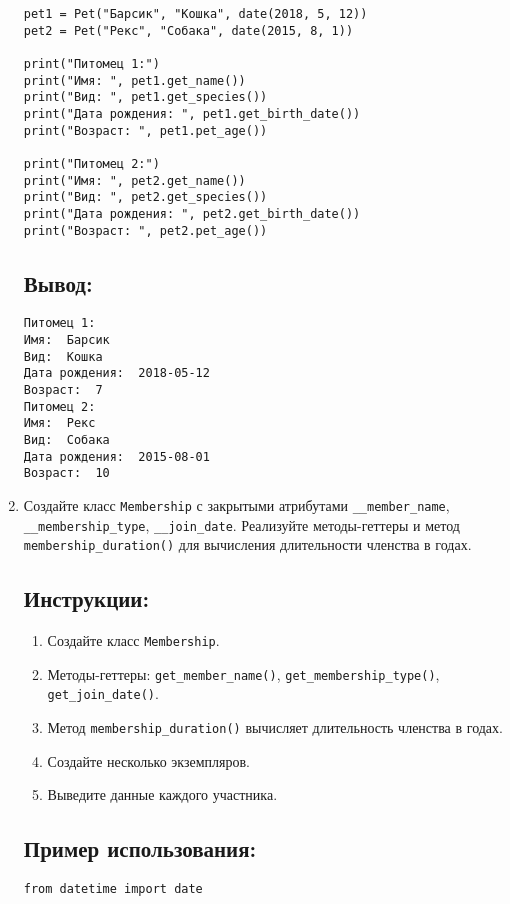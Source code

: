 \begin{enumerate}
\begin{lstlisting}[caption=Пример кода]
pet1 = Pet("Барсик", "Кошка", date(2018, 5, 12))
pet2 = Pet("Рекс", "Собака", date(2015, 8, 1))

print("Питомец 1:")
print("Имя: ", pet1.get_name())
print("Вид: ", pet1.get_species())
print("Дата рождения: ", pet1.get_birth_date())
print("Возраст: ", pet1.pet_age())

print("Питомец 2:")
print("Имя: ", pet2.get_name())
print("Вид: ", pet2.get_species())
print("Дата рождения: ", pet2.get_birth_date())
print("Возраст: ", pet2.pet_age())
\end{lstlisting}

\subsection*{Вывод:}
\begin{lstlisting}[caption=Ожидаемый вывод]
Питомец 1:
Имя:  Барсик
Вид:  Кошка
Дата рождения:  2018-05-12
Возраст:  7
Питомец 2:
Имя:  Рекс
Вид:  Собака
Дата рождения:  2015-08-01
Возраст:  10
\end{lstlisting}

\item
Создайте класс \texttt{Membership} с закрытыми атрибутами \texttt{\_\_member\_name}, \texttt{\_\_membership\_type}, \texttt{\_\_join\_date}. Реализуйте методы-геттеры и метод \texttt{membership\_duration()} для вычисления длительности членства в годах.

\subsection*{Инструкции:}
\begin{enumerate}
    \item Создайте класс \texttt{Membership}.
    \item Методы-геттеры: \texttt{get\_member\_name()}, \texttt{get\_membership\_type()}, \texttt{get\_join\_date()}.
    \item Метод \texttt{membership\_duration()} вычисляет длительность членства в годах.
    \item Создайте несколько экземпляров.
    \item Выведите данные каждого участника.
\end{enumerate}

\subsection*{Пример использования:}
\begin{lstlisting}[caption=Пример кода]
from datetime import date


\end{lstlisting}
\end{enumerate}

